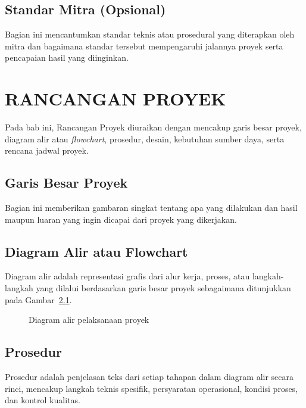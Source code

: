 \documentclass[proyek,laporan]{itkta2025}
\begin{document}
\section{Standar Mitra (Opsional)}
Bagian ini mencantumkan standar teknis atau prosedural yang diterapkan oleh mitra dan bagaimana standar tersebut mempengaruhi jalannya proyek serta pencapaian hasil yang diinginkan.

\chapter{RANCANGAN PROYEK}
Pada bab ini, Rancangan Proyek diuraikan dengan mencakup garis besar proyek, diagram alir atau \textit{flowchart}, prosedur, desain, kebutuhan sumber daya, serta rencana jadwal proyek.

\section{Garis Besar Proyek}
Bagian ini memberikan gambaran singkat tentang apa yang dilakukan dan hasil maupun luaran yang ingin dicapai dari proyek yang dikerjakan.

\section{Diagram Alir atau Flowchart}
Diagram alir adalah representasi grafis dari alur kerja, proses, atau langkah-langkah yang dilalui berdasarkan garis besar proyek sebagaimana ditunjukkan pada Gambar~\ref{fig:flowchart_proyek}.

\begin{figure}[htbp]
  \centering
  \caption{Diagram alir pelaksanaan proyek}
  \label{fig:flowchart_proyek}
\end{figure}

\section{Prosedur}
Prosedur adalah penjelasan teks dari setiap tahapan dalam diagram alir secara rinci, mencakup langkah teknis spesifik, persyaratan operasional, kondisi proses, dan kontrol kualitas.
\end{document}
